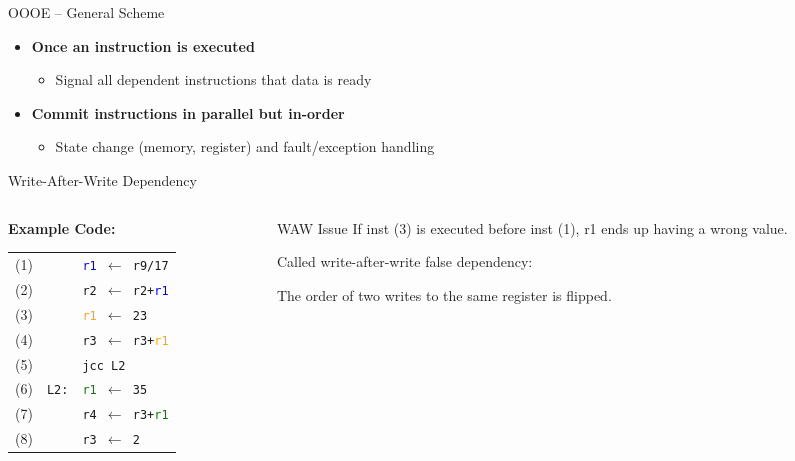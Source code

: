\documentclass[aspectratio=169,12pt]{beamer}
\begin{document}
\begin{frame}{OOOE -- General Scheme}
\begin{itemize}
    \item \textbf{Once an instruction is executed}
    \begin{itemize}
      \item Signal all dependent instructions that data is ready
    \end{itemize}
    
    \item \textbf{Commit instructions in parallel but in-order}
    \begin{itemize}
      \item State change (memory, register) and fault/exception handling
    \end{itemize}
  \end{itemize}
\end{frame}

\begin{frame}{Write-After-Write Dependency}
  \begin{columns}
    \begin{column}{0.5\textwidth}
      \textbf{Example Code:} \\
      \begin{tabular}{lll}
        (1) & & \texttt{\textcolor{blue}{r1} $\leftarrow$ r9/17} \\
        (2) & & \texttt{r2 $\leftarrow$ r2+\textcolor{blue}{r1}} \\
        (3) & & \texttt{\textcolor{orange}{r1} $\leftarrow$ 23} \\
        (4) & & \texttt{r3 $\leftarrow$ r3+\textcolor{orange}{r1}} \\
        (5) & & \texttt{jcc L2} \\
        (6) & \texttt{L2:} & \texttt{\textcolor{green}{r1} $\leftarrow$ 35} \\
        (7) & & \texttt{r4 $\leftarrow$ r3+\textcolor{green}{r1}} \\
        (8) & & \texttt{r3 $\leftarrow$ 2} \\
      \end{tabular}
    \end{column}
    
    \begin{column}{0.5\textwidth}
      \begin{block}{WAW Issue}
        If inst (3) is executed before inst (1), r1 ends up having a wrong value.
        
        \vspace{0.3cm}
        
        Called \alert{write-after-write false dependency}:
        
        The order of two writes to the same register is flipped.
      \end{block}
    \end{column}
  \end{columns}
\end{frame}
\end{document}
